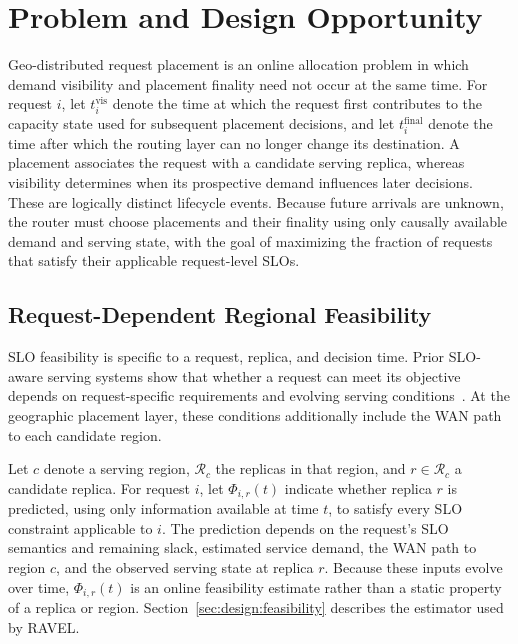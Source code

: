 \section{Problem and Design Opportunity}
\label{sec:problem}

Geo-distributed request placement is an online allocation problem in which
demand visibility and placement finality need not occur at the same time.
For request $i$, let $t_i^{\mathrm{vis}}$ denote the time at which the request
first contributes to the capacity state used for subsequent placement
decisions, and let $t_i^{\mathrm{final}}$ denote the time after which the
routing layer can no longer change its destination.
A placement associates the request with a candidate serving replica, whereas
visibility determines when its prospective demand influences later decisions.
These are logically distinct lifecycle events.
Because future arrivals are unknown, the router must choose placements and
their finality using only causally available demand and serving state, with the
goal of maximizing the fraction of requests that satisfy their applicable
request-level SLOs.


\subsection{Request-Dependent Regional Feasibility}
\label{sec:problem:feasibility}

SLO feasibility is specific to a request, replica, and decision time.
Prior SLO-aware serving systems show that whether a request can meet its
objective depends on request-specific requirements and evolving serving
conditions~\cite{distserve,jitserve,quartz,andes}.
At the geographic placement layer, these conditions additionally include the
WAN path to each candidate region.

Let $c$ denote a serving region, $\mathcal{R}_c$ the replicas in that region,
and $r\in\mathcal{R}_c$ a candidate replica.
For request $i$, let $\Phi_{i,r}(t)$ indicate whether replica $r$ is predicted,
using only information available at time $t$, to satisfy every SLO constraint
applicable to $i$.
The prediction depends on the request's SLO semantics and remaining slack,
estimated service demand, the WAN path to region $c$, and the observed serving
state at replica $r$.
Because these inputs evolve over time, $\Phi_{i,r}(t)$ is an online feasibility
estimate rather than a static property of a replica or region.
Section~\ref{sec:design:feasibility} describes the estimator used by RAVEL.


